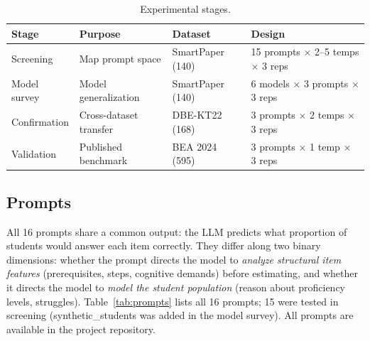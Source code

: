 \documentclass[runningheads]{llncs}
\begin{document}
\begin{table}[t]
\caption{Experimental stages.}\label{tab:stages}
\centering\footnotesize
\begin{tabular}{@{}lp{2.5cm}p{2.5cm}l@{}}
\toprule
Stage & Purpose & Dataset & Design \\
\midrule
Screening & Map prompt space & SmartPaper (140) & 15 prompts $\times$ 2--5 temps $\times$ 3 reps \\
Model survey & Model generalization & SmartPaper (140) & 6 models $\times$ 3 prompts $\times$ 3 reps \\
Confirmation & Cross-dataset transfer & DBE-KT22 (168) & 3 prompts $\times$ 2 temps $\times$ 3 reps \\
Validation & Published benchmark & BEA 2024 (595) & 3 prompts $\times$ 1 temp $\times$ 3 reps \\
\bottomrule
\end{tabular}
\end{table}

\subsection{Prompts}

All 16 prompts share a common output: the LLM predicts what proportion of students would answer each item correctly. They differ along two binary dimensions: whether the prompt directs the model to \emph{analyze structural item features} (prerequisites, steps, cognitive demands) before estimating, and whether it directs the model to \emph{model the student population} (reason about proficiency levels, struggles). Table~\ref{tab:prompts} lists all 16 prompts; 15 were tested in screening (synthetic\_students was added in the model survey). All prompts are available in the project repository.
\end{document}
